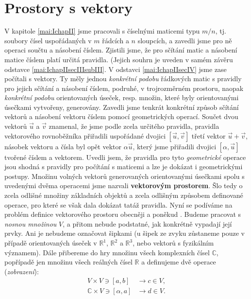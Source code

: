   \section{Prostory s vektory}
    V kapitole \ref{mai:IchapII} jsme pracovali s číselnými maticemi typu \(m/n\), tj. soubory 
    čísel uspořádaných v \(m\) řádcích a \(n\) sloupcích, a zavedli jsme pro ně operaci součtu a 
    násobení číslem. Zjistili jsme, že pro sčítání matic a násobení matice číslem platí určitá 
    pravidla. (Jejich souhrn je uveden v samém závěru odstavce \ref{mai:IchapIIsecIIIsubIII}. V 
    odstavci \ref{mai:IchapIIsecIV} jsme zase počítali s vektory. Ty měly jednou \emph{konkrétní 
    podobu} řádkových matic s pravidly pro jejich sčítání a násobení číslem, podruhé, v 
    trojrozměrném prostoru, naopak \emph{konkrétní podobu} orientovaných úseček, resp. množin, 
    které byly orientovanými úsečkami vytvořeny, generovány. Zavedli jsme tenkrát konkrétní způsob 
    sčítání vektorů a násobení vektoru číslem pomocí geometrických operací. Součet dvou vektorů 
    \(\vec{u}\) a \(\vec{v}\) znamenal, že jsme podle zcela určitého pravidla, pravidla 
    vektorového rovnoběžníka přiřadili uspořádané dvojici \([\vec{u},\vec{v}]\) třetí vektor 
    \(\vec{u} + \vec{v}\), násobek vektoru a čísla byl opět vektor \(\alpha\vec{u}\), který jsme 
    přiřadili dvojici \([\alpha,\vec{u}]\) tvořené číslem a vektorem. Uvedli jsem, že pravidla pro 
    tyto \emph{geometrické} operace jsou shodná s pravidly pro počítání s maticemi a lze je dokázat 
    i geometrickými postupy. Množinu volných vektorů generovaných orientovanými úsečkami spolu s 
    uvedenými dvěma operacemi jsme nazvali \textbf{vektorovým prostorem}. Šlo tedy o zcela odlišné 
    množiny základních objektů a zcela odlišným způsobem definované operace, pro které se však dala 
    dokázat tatáž pravidla. Nyní se podíváme na problém definice vektorového prostoru obecněji a 
    poněkud . Budeme pracovat s \emph{nosnou množinou} \(V\), a přitom nebude podstatné, 
    jak konkrétně vypadají její prvky. Ani je nebudeme označovat šipkami (u šipek ze zvyku 
    zůstaneme pouze v případě orientovaných úseček v \(\mathbb{R}^1\), \(\mathbb{R}^2\) a 
    \(\mathbb{R}^3\), nebo vektorů s fyzikálním významem). Dále přibereme do hry množinu všech 
    komplexních čísel \(\mathbb{C}\), popřípadě jen množinu všech reálných čísel \(\mathbb{R}\) a 
    definujeme dvě operace (\emph{zobrazení}):
    \begin{subequations}\label{mai:eq046}
      \begin{align}
        V \times V \ni [a,b]            &\longrightarrow c\in V, \label{mai:eq046a}  \\
        \mathbb{C}\times V\ni[\alpha,a] &\longrightarrow d\in V. \label{mai:eq046b}
      \end{align}
    \end{subequations}
